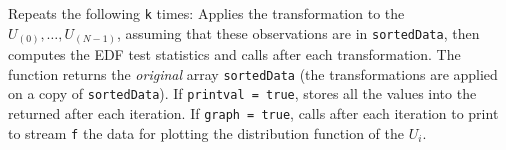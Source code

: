\begin{tabb} Repeats the following \texttt{k} times:
  Applies the 
  transformation to the
  $U_{(0)},\dots,U_{(N-1)}$, assuming that these observations are in
  \texttt{sortedData}, then computes the EDF test statistics and calls
   after each transformation.
  The function returns the {\em original\/} array \texttt{sortedData} (the
  transformations are applied on a copy of \texttt{sortedData}).
  If \texttt{printval = true}, stores all the values into the returned
   after each iteration.
  If \texttt{graph = true}, calls  after each iteration
  to print to stream \texttt{f} the data for plotting the distribution
  function of the $U_i$.
\end{tabb}
\begin{htmlonly}
\end{htmlonly}
